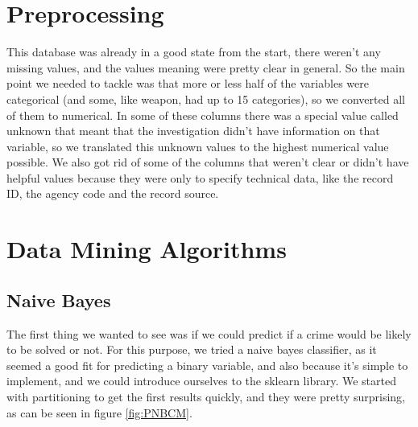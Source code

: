 \documentclass[12pt]{report}
\begin{document}
%

\section{Preprocessing}

This database was already in a good state from the start, there weren't any missing values, and the values meaning were pretty clear in general. So the main point we needed to tackle was that more or less half of the variables were categorical (and some, like weapon, had up to 15 categories), so we converted all of them to numerical. In some of these columns there was a special value called unknown that meant that the investigation didn't have information on that variable, so we translated this unknown values to the highest numerical value possible.
We also got rid of some of the columns that weren't clear or didn't have helpful values because they were only to specify technical data, like the record ID, the agency code and the record source.

\section{Data Mining Algorithms}

\subsection{Naive Bayes}

The first thing we wanted to see was if we could predict if a crime would be likely to be solved or not. For this purpose, we tried a naive bayes classifier, as it seemed a good fit for predicting a binary variable, and also because it's simple to implement, and we could introduce ourselves to the sklearn library.
We started with partitioning to get the first results quickly, and they were pretty surprising, as can be seen in figure 	 \ref{fig:PNBCM}.
\end{document}
